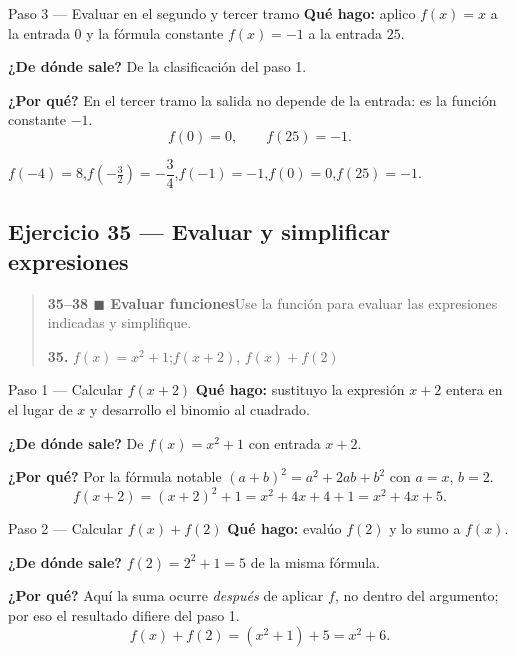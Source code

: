 \documentclass[11pt]{article}
\begin{document}
\begin{paso}{Paso 3 --- Evaluar en el segundo y tercer tramo}
\textbf{Qué hago:} aplico $f(x)=x$ a la entrada $0$ y la fórmula constante $f(x)=-1$ a la entrada $25$.

\textbf{¿De dónde sale?} De la clasificación del paso 1.

\textbf{¿Por qué?} En el tercer tramo la salida no depende de la entrada: es la función constante $-1$.
\[
f(0)=0,\qquad f(25)=-1.
\]
\end{paso}

\begin{resp}
$f(-4)=8$,\quad $f\!\left(-\tfrac32\right)=-\dfrac34$,\quad $f(-1)=-1$,\quad $f(0)=0$,\quad $f(25)=-1$.
\end{resp}

\subsection*{Ejercicio 35 — Evaluar y simplificar expresiones}

\begin{quote}
\textbf{35--38 $\blacksquare$ Evaluar funciones}\quad Use la función para evaluar las expresiones indicadas y simplifique.

\textbf{35.} $f(x)=x^2+1$;\quad $f(x+2)$, $f(x)+f(2)$
\end{quote}

\begin{paso}{Paso 1 --- Calcular $f(x+2)$}
\textbf{Qué hago:} sustituyo la expresión $x+2$ entera en el lugar de $x$ y desarrollo el binomio al cuadrado.

\textbf{¿De dónde sale?} De $f(x)=x^2+1$ con entrada $x+2$.

\textbf{¿Por qué?} Por la fórmula notable $(a+b)^2=a^2+2ab+b^2$ con $a=x$, $b=2$.
\[
f(x+2)=(x+2)^2+1=x^2+4x+4+1=x^2+4x+5.
\]
\end{paso}

\begin{paso}{Paso 2 --- Calcular $f(x)+f(2)$}
\textbf{Qué hago:} evalúo $f(2)$ y lo sumo a $f(x)$.

\textbf{¿De dónde sale?} $f(2)=2^2+1=5$ de la misma fórmula.

\textbf{¿Por qué?} Aquí la suma ocurre \emph{después} de aplicar $f$, no dentro del argumento; por eso el resultado difiere del paso 1.
\[
f(x)+f(2)=(x^2+1)+5=x^2+6.
\]
\end{paso}
\end{document}
